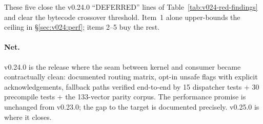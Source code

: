 These five close the v0.24.0 ``DEFERRED'' lines of
Table~\ref{tab:v024-red-findings} and clear the bytecode crossover
threshold. Item~1 alone upper-bounds the ceiling in
\S\ref{sec:v024:perf}; items 2--5 buy the rest.

\paragraph{Net.} v0.24.0 is the release where the seam between kernel
and consumer became contractually clean: documented routing matrix,
opt-in unsafe flags with explicit acknowledgements, fallback paths
verified end-to-end by 15 dispatcher tests + 30 precompile tests + the
133-vector parity corpus. The performance promise is unchanged from
v0.23.0; the gap to the target is documented precisely. v0.25.0 is
where it closes.

